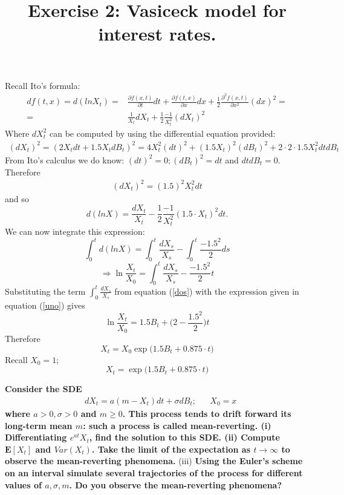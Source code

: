 \documentclass[12pt]{article}
\begin{document}
Recall Ito's formula:
\begin{align}
df(t,x) = d(lnX_t) =& \frac{\partial f(x,t)}{\partial t} dt + \frac{\partial f(t,x)}{\partial x}dx + \frac{1}{2}\frac{\partial^2f(x,t)}{\partial x^2}(dx)^2= \\
= & \frac{1}{X_t}dX_t +\frac{1}{2}\frac{-1}{X_t^2}(dX_t)^2  
\end{align}
Where $dX_t^2$ can be computed by using the differential equation provided:
\begin{align}
(dX_t)^2   = (2X_tdt+1.5X_tdB_t)^2 = 4X_t^2(dt)^2 + (1.5X_t)^2(dB_t)^2+2\cdot2\cdot1.5X_t^2dtdB_t
\end{align}
From Ito's calculus we do know: $(dt)^2=0; (dB_t)^2=dt$ and $dtdB_t=0$. Therefore
\begin{align}
(dX_t)^2   = (1.5)^2X_t^2dt
\end{align}
and so
\begin{equation}
d(lnX) = \frac{dX_t}{X_t} - \frac{1}{2}\frac{-1}{X_t^2}(1.5 \cdot X_t)^2 dt  .
\end{equation}
We can now integrate this expression:
\begin{equation}
\int_0^t d(lnX) = \int_0^t \frac{dX_s}{X_s} - \int_0^t \frac{-1.5^2}{2} ds   
\end{equation}
\begin{equation}\label{dos}
\Rightarrow \ln \frac{X_t}{X_0} =  \int_0^t \frac{dX_s}{X_s} -  \frac{-1.5^2}{2} t
\end{equation}
Substituting the term $\int_0^t \frac{dX_s}{X_s}$ from equation (\ref{dos}) with the expression given in equation (\ref{uno}) gives
\begin{equation}
\ln \frac{X_t}{X_0} = 1.5B_t + \bigg(2-\frac{1.5^2}{2}\bigg)t
\end{equation}
Therefore
\begin{equation}
X_t = X_0 \exp\bigg(1.5B_t+0.875\cdot t\bigg)
\end{equation}
Recall $X_0=1$;
\begin{equation}
\boxed{X_t = \exp\bigg(1.5B_t+0.875\cdot t\bigg)}
\end{equation}
\title {{\bf Exercise 2:} {\bf Vasiceck model for interest rates. }}
{\bf Consider the SDE}
\begin{align*}
&dX_t = a(m-X_t)dt + \sigma dB_t; && X_0=x
\end{align*}
{\bf where $a>0, \sigma >0$ and $m\ge 0$. This process tends to drift forward its long-term mean $m$: such a process is called mean-reverting. 
(i) {\bf Differentiating $e^{at}X_t$, find the solution to this SDE.}
(ii) {\bf Compute $\mathbf{E}[X_t]$} and $Var(X_t)$. Take the limit of the expectation as $t\longrightarrow \infty$ to observe the mean-reverting phenomena.}
(iii) {\bf Using the Euler's scheme on an interval simulate several trajectories of the process for different values of $a,\sigma, m$. Do you observe the mean-reverting phenomena? } \\
\end{document}
